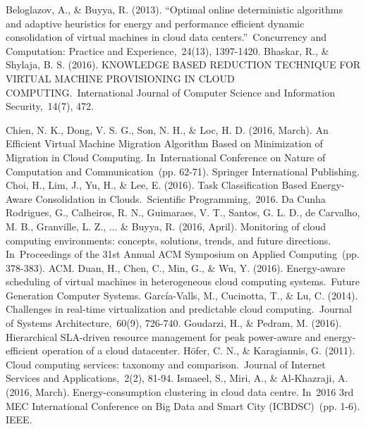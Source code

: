 
\begin{thebibliography}{99}

\begin{LTRbibitems}
\resetlatinfont
	  Beloglazov, A., \& Buyya, R. (2013). “Optimal online deterministic algorithms and adaptive heuristics for energy and performance efficient dynamic consolidation of virtual machines in cloud data centers.” Concurrency and Computation: Practice and Experience, 24(13), 1397-1420.
	 Bhaskar, R., \& Shylaja, B. S. (2016). KNOWLEDGE BASED REDUCTION TECHNIQUE FOR VIRTUAL MACHINE PROVISIONING IN CLOUD COMPUTING. International Journal of Computer Science and Information Security, 14(7), 472.
	 	
	 Chien, N. K., Dong, V. S. G., Son, N. H., \& Loc, H. D. (2016, March). An Efficient Virtual Machine Migration Algorithm Based on Minimization of Migration in Cloud Computing. In International Conference on Nature of Computation and Communication (pp. 62-71). Springer International Publishing.
	 Choi, H., Lim, J., Yu, H., \& Lee, E. (2016). Task Classification Based Energy-Aware Consolidation in Clouds. Scientific Programming, 2016.
	Da Cunha Rodrigues, G., Calheiros, R. N., Guimaraes, V. T., Santos, G. L. D., de Carvalho, M. B., Granville, L. Z., ... \& Buyya, R. (2016, April). Monitoring of cloud computing environments: concepts, solutions, trends, and future directions. In Proceedings of the 31st Annual ACM Symposium on Applied Computing (pp. 378-383). ACM.
	  Duan, H., Chen, C., Min, G., \& Wu, Y. (2016). Energy-aware scheduling of virtual machines in heterogeneous cloud computing systems. Future Generation Computer Systems.
	García-Valls, M., Cucinotta, T., \& Lu, C. (2014). Challenges in real-time virtualization and predictable cloud computing. Journal of Systems Architecture, 60(9), 726-740.
	 Goudarzi, H., \& Pedram, M. (2016). Hierarchical SLA-driven resource management for peak power-aware and energy-efficient operation of a cloud datacenter.
	Höfer, C. N., \& Karagiannis, G. (2011). Cloud computing services: taxonomy and comparison. Journal of Internet Services and Applications, 2(2), 81-94.
	  Ismaeel, S., Miri, A., \& Al-Khazraji, A. (2016, March). Energy-consumption clustering in cloud data centre. In 2016 3rd MEC International Conference on Big Data and Smart City (ICBDSC) (pp. 1-6). IEEE.

\end{LTRbibitems}
\end{thebibliography}
